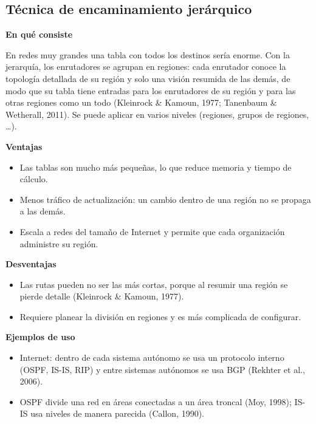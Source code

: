 \documentclass[12pt,letterpaper]{article}
\newcommand{\rub}[1]{\par\medskip\noindent\textbf{#1}\par\nopagebreak}
\begin{document}
\subsection{Técnica de encaminamiento jerárquico}
\rub{En qué consiste}
En redes muy grandes una tabla con todos los destinos sería enorme. Con la jerarquía, los enrutadores se agrupan en regiones: cada enrutador conoce la topología detallada de su región y solo una visión resumida de las demás, de modo que su tabla tiene entradas para los enrutadores de su región y para las otras regiones como un todo (Kleinrock \& Kamoun, 1977; Tanenbaum \& Wetherall, 2011). Se puede aplicar en varios niveles (regiones, grupos de regiones, \ldots).
\rub{Ventajas}
\begin{itemize}[itemsep=2pt]
\item Las tablas son mucho más pequeñas, lo que reduce memoria y tiempo de cálculo.
\item Menos tráfico de actualización: un cambio dentro de una región no se propaga a las demás.
\item Escala a redes del tamaño de Internet y permite que cada organización administre su región.
\end{itemize}
\rub{Desventajas}
\begin{itemize}[itemsep=2pt]
\item Las rutas pueden no ser las más cortas, porque al resumir una región se pierde detalle (Kleinrock \& Kamoun, 1977).
\item Requiere planear la división en regiones y es más complicada de configurar.
\end{itemize}
\rub{Ejemplos de uso}
\begin{itemize}[itemsep=2pt]
\item Internet: dentro de cada sistema autónomo se usa un protocolo interno (OSPF, IS-IS, RIP) y entre sistemas autónomos se usa BGP (Rekhter et al., 2006).
\item OSPF divide una red en áreas conectadas a un área troncal (Moy, 1998); IS-IS usa niveles de manera parecida (Callon, 1990).
\end{itemize}
\end{document}
